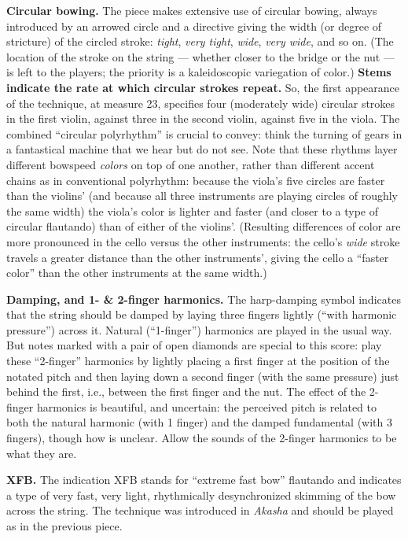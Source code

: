 \textbf{Circular bowing.} The piece makes extensive use of circular bowing, always
introduced by an arrowed circle and a directive giving the width (or degree of stricture)
of the circled stroke: \textit{tight}, \textit{very tight}, \textit{wide}, \textit{very
wide}, and so on. (The location of the stroke on the string --- whether closer to the
bridge or the nut --- is left to the players; the priority is a kaleidoscopic variegation
of color.) \textbf{Stems indicate the rate at which circular strokes repeat.} So, the
first appearance of the technique, at measure 23, specifies four (moderately wide)
circular strokes in the first violin, against three in the second violin, against five in
the viola. The combined ``circular polyrhythm'' is crucial to convey: think the turning
of gears in a fantastical machine that we hear but do not see. Note that these rhythms
layer different bowspeed \textit{colors} on top of one another, rather than different
accent chains as in conventional polyrhythm: because the viola's five circles are faster
than the violins' (and because all three instruments are playing circles of roughly the
same width) the viola's color is lighter and faster (and closer to a type of circular
flautando) than of either of the violins'. (Resulting differences of color are more
pronounced in the cello versus the other instruments: the cello's \textit{wide} stroke
travels a greater distance than the other instruments', giving the cello a ``faster
color'' than the other instruments at the same width.)

\textbf{ Damping, and 1- \& 2-finger harmonics.} The harp-damping symbol indicates that
the string should be damped by laying three fingers lightly (``with harmonic pressure'')
across it. Natural (``1-finger'') harmonics are played in the usual way. But notes marked
with a pair of open diamonds are special to this score: play these ``2-finger'' harmonics
by lightly placing a first finger at the position of the notated pitch and then laying
down a second finger (with the same pressure) just behind the first, i.e., between the
first finger and the nut. The effect of the 2-finger harmonics is beautiful, and
uncertain: the perceived pitch is related to both the natural harmonic (with 1
finger) and the damped fundamental (with 3 fingers), though how is unclear. Allow the
sounds of the 2-finger harmonics to be what they are.

\textbf{XFB.} The indication XFB stands for ``extreme fast bow'' flautando and indicates
a type of very fast, very light, rhythmically desynchronized skimming of the bow across
the string. The technique was introduced in \textit{Akasha} and should be played as in
the previous piece.

